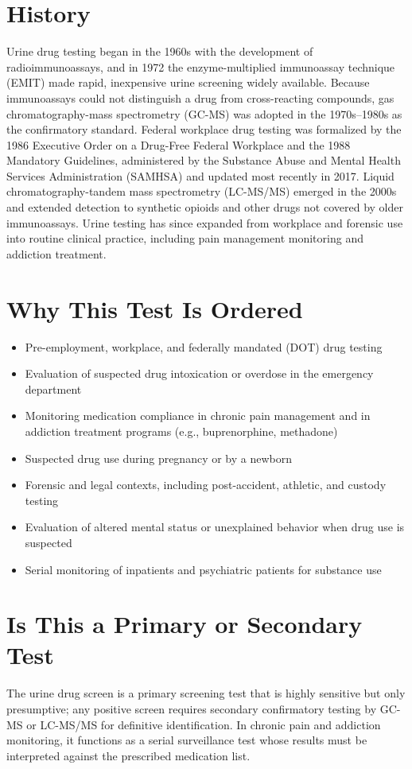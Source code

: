 \section*{History}
Urine drug testing began in the 1960s with the development of radioimmunoassays, and in 1972 the enzyme-multiplied immunoassay technique (EMIT) made rapid, inexpensive urine screening widely available. Because immunoassays could not distinguish a drug from cross-reacting compounds, gas chromatography-mass spectrometry (GC-MS) was adopted in the 1970s--1980s as the confirmatory standard. Federal workplace drug testing was formalized by the 1986 Executive Order on a Drug-Free Federal Workplace and the 1988 Mandatory Guidelines, administered by the Substance Abuse and Mental Health Services Administration (SAMHSA) and updated most recently in 2017. Liquid chromatography-tandem mass spectrometry (LC-MS/MS) emerged in the 2000s and extended detection to synthetic opioids and other drugs not covered by older immunoassays. Urine testing has since expanded from workplace and forensic use into routine clinical practice, including pain management monitoring and addiction treatment.
\section*{Why This Test Is Ordered}
\begin{itemize}
  \item Pre-employment, workplace, and federally mandated (DOT) drug testing
  \item Evaluation of suspected drug intoxication or overdose in the emergency department
  \item Monitoring medication compliance in chronic pain management and in addiction treatment programs (e.g., buprenorphine, methadone)
  \item Suspected drug use during pregnancy or by a newborn
  \item Forensic and legal contexts, including post-accident, athletic, and custody testing
  \item Evaluation of altered mental status or unexplained behavior when drug use is suspected
  \item Serial monitoring of inpatients and psychiatric patients for substance use
\end{itemize}
\section*{Is This a Primary or Secondary Test}
The urine drug screen is a primary screening test that is highly sensitive but only presumptive; any positive screen requires secondary confirmatory testing by GC-MS or LC-MS/MS for definitive identification. In chronic pain and addiction monitoring, it functions as a serial surveillance test whose results must be interpreted against the prescribed medication list.
